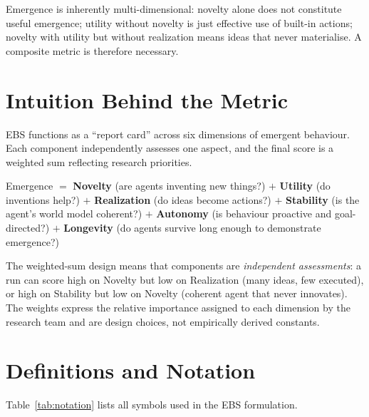 \documentclass[a4paper, 11pt]{article}
\begin{document}
Emergence is inherently multi-dimensional: novelty alone does not constitute useful emergence; utility without novelty is just effective use of built-in actions; novelty with utility but without realization means ideas that never materialise. A composite metric is therefore necessary.

\section{Intuition Behind the Metric}

EBS functions as a ``report card'' across six dimensions of emergent behaviour. Each component independently assesses one aspect, and the final score is a weighted sum reflecting research priorities.

\begin{keyidea}
    Emergence $=$ \textbf{Novelty} (are agents inventing new things?) $+$ \textbf{Utility} (do inventions help?) $+$ \textbf{Realization} (do ideas become actions?) $+$ \textbf{Stability} (is the agent's world model coherent?) $+$ \textbf{Autonomy} (is behaviour proactive and goal-directed?) $+$ \textbf{Longevity} (do agents survive long enough to demonstrate emergence?)
\end{keyidea}

The weighted-sum design means that components are \emph{independent assessments}: a run can score high on Novelty but low on Realization (many ideas, few executed), or high on Stability but low on Novelty (coherent agent that never innovates). The weights express the relative importance assigned to each dimension by the research team and are design choices, not empirically derived constants.

\section{Definitions and Notation}

Table~\ref{tab:notation} lists all symbols used in the EBS formulation.
\end{document}

